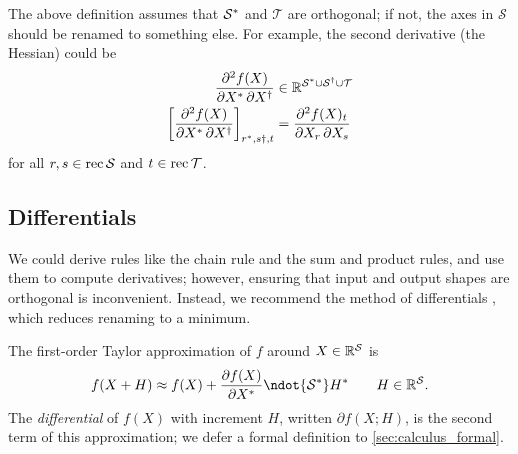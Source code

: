 The above definition assumes that $\mathcal{S}^*$ and $\mathcal{T}$ are orthogonal; if not, the axes in $ \mathcal{S}$ should be renamed to something else. For example, the second derivative (the Hessian) could be
\begin{align*}
\frac{\partial^2 f(X)}{\partial X^* \, \partial X^\dag} &\in \mathbb{R}^{\mathcal{S}^* \cup \mathcal{S}^\dag \cup \mathcal{T}} \\
\left[\frac{\partial^2 f(X)}{\partial X^* \, \partial X^\dag}\right]_{r^*, s\dag, t} &= \frac{\partial^2 f(X)_t}{\partial X_r \, \partial X_s}
\end{align*}
for all $r, s \in \operatorname{rec}\mathcal{S}$ and $t \in \operatorname{rec}\mathcal{T}$.

\subsection{Differentials}

We could derive rules like the chain rule and the sum and product rules, and use them to compute derivatives; however, ensuring that input and output shapes are orthogonal is inconvenient. Instead, we recommend the method of differentials \citep{magnus+neudecker:1985}, which reduces renaming to a minimum.

The first-order Taylor approximation of $f$ around $X \in \mathbb{R}^{\mathcal{S}}$ is
\begin{equation*}
  f(X+H) \approx f(X) + \ddx{f(X)} \ndot{\mathcal{S}\inax} H\inax \qquad H \in \reals^{\mathcal{S}}.
\end{equation*}
The \emph{differential} of $f(X)$ with increment $H$, written $\partial f (X; H)$, is the second term of this approximation;
we defer a formal definition to \cref{sec:calculus_formal}.

